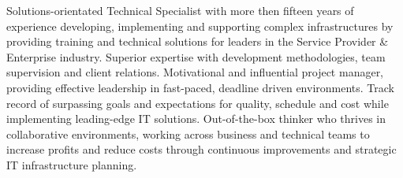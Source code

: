 

\begin{cvparagraph}

	Solutions-orientated Technical Specialist with more then fifteen years of experience developing, implementing and supporting complex infrastructures by providing training and technical
	solutions for leaders in the Service Provider \& Enterprise industry. Superior expertise with development methodologies, team 
	supervision and client relations. Motivational and influential project manager, providing effective leadership in fast-paced, 
	deadline driven environments. Track record of surpassing goals and expectations for quality, schedule and cost while implementing 
	leading-edge IT solutions. Out-of-the-box thinker who thrives in collaborative environments, working across business and technical 
	teams to increase profits and reduce costs through continuous improvements and strategic IT infrastructure planning.
\end{cvparagraph}
